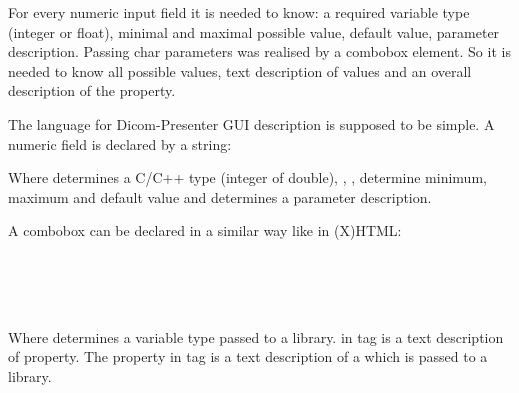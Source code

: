 For every numeric input field it is needed to know: a required variable type (integer or float), minimal and maximal possible value, default value, parameter description. Passing char parameters was realised by a combobox element. So it is needed to know all possible values, text description of values and an overall description of the property. 

The language for Dicom-Presenter GUI description is supposed to be simple. A numeric field is declared by a string:


Where  determines a C/C++ type (integer of double), , ,  determine minimum, maximum and default value and  determines a parameter description.

A combobox can be declared in a similar way like in (X)HTML:

\noindent \indent {}\\
\indent \indent {}\\
\indent \indent {}\\
\indent {}

Where  determines a variable type passed to a library.  in  tag is a text description of property. The  property in  tag is a text description of a  which is passed to a library.


\begin{comment}
First idea was to use our own way to describe plugin GUI. The first version of plugins system used it's own primitive language. Lines in description file were corresponding to GUI elements. First word of a line determined a type of an element. Other words on the line described element behaviour such as default value, minimum and maximum value or a corresponding function in a library. This own language of GUI description was sufficient but it was unnecessary to force plugin programmer to use our own language. Instead it would be better to use some existing standard.

Other way how to describe a plugin GUI was to use XML language. XML is often use in computer science to pass information in an easily processable form. Moreover Qt library includes extended tools for XML processing.

Last option is to use Qt language for UI description. Qt library uses it's own form to describe application GUI - description is in a special file with a \clist{.ui} extension. It is a strong argument for this option that it is a native way for Qt library to use this langage. Qt library provides a utility for interactive GUI creating. 
\end{comment}



